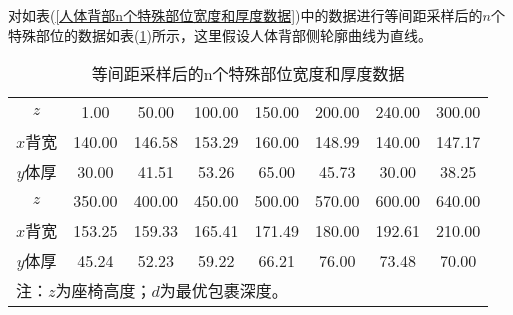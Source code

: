             \par
            对如表(\ref{人体背部n个特殊部位宽度和厚度数据})中的数据进行等间距采样后的$n$个特殊部位的数据如表(\ref{等间距采样后的n个特殊部位宽度和厚度数据})所示，这里假设人体背部侧轮廓曲线为直线。
        \begin{table}[H]
        \centering
        \caption{等间距采样后的n个特殊部位宽度和厚度数据}
        \label{等间距采样后的n个特殊部位宽度和厚度数据}
        \begin{tabular}{cccccccc}
        \toprule
        $z$ & 1.00   & 50.00  & 100.00 & 150.00 & 200.00 & 240.00 & 300.00\\
        $x$背宽 & 140.00 & 146.58 & 153.29 & 160.00 & 148.99 & 140.00 & 147.17\\
        $y$体厚  & 30.00  & 41.51  & 53.26  & 65.00  & 45.73  & 30.00  & 38.25 \\
        \hline
        \hline
        $z$ & 350.00 & 400.00 & 450.00 & 500.00 & 570.00 & 600.00 & 640.00\\
        $x$背宽 & 153.25 & 159.33 & 165.41 & 171.49 & 180.00 & 192.61 & 210.00\\
        $y$体厚 & 45.24  & 52.23  & 59.22  & 66.21  & 76.00  & 73.48  & 70.00 \\
        \bottomrule
        \multicolumn{8}{l}{\footnotesize 注：$z$为座椅高度；$d$为最优包裹深度。}\\
        \end{tabular}
        \end{table}

